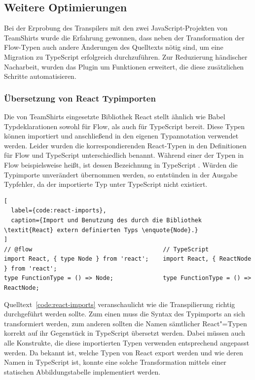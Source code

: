 

\subsection{Weitere Optimierungen}
\label{sec:optimizations}

Bei der Erprobung des Transpilers mit den zwei JavaScript-Projekten von TeamShirts wurde die Erfahrung gewonnen, dass neben der Transformation der Flow-Typen auch andere Änderungen des Quelltexts nötig sind, um eine Migration zu TypeScript erfolgreich durchzuführen. Zur Reduzierung händischer Nacharbeit, wurden das Plugin um Funktionen erweitert, die diese zusätzlichen Schritte automatisieren.

\subsubsection{Übersetzung von React Typimporten}
\label{sec:react-type-import-mapping}

Die von TeamShirts eingesetzte Bibliothek React stellt ähnlich wie Babel Typdeklarationen sowohl für Flow, als auch für TypeScript bereit. Diese Typen können importiert und anschließend in den eigenen Typannotation verwendet werden. Leider wurden die korrespondierenden React-Typen in den Definitionen für Flow und TypeScript unterschiedlich benannt. Während einer der Typen in Flow beispielsweise  heißt, ist dessen Bezeichnung in TypeScript . Würden die Typimporte unverändert übernommen werden, so entstünden in der Ausgabe Typfehler, da der importierte Typ unter TypeScript nicht existiert.

\begin{lstlisting}[
  label={code:react-imports},
  caption={Import und Benutzung des durch die Bibliothek \textit{React} extern definierten Typs \enquote{Node}.}
]
// @flow                                     // TypeScript
import React, { type Node } from 'react';    import React, { ReactNode } from 'react';
type FunctionType = () => Node;              type FunctionType = () => ReactNode;
\end{lstlisting}

Quelltext~\ref{code:react-imports} veranschaulicht wie die Transpilierung richtig durchgeführt werden sollte. Zum einen muss die Syntax des Typimports an sich transformiert werden, zum anderen sollten die Namen sämtlicher React"=Typen korrekt auf ihr Gegenstück in TypeScript übersetzt werden. Dabei müssen auch alle Konstrukte, die diese importierten Typen verwenden entsprechend angepasst werden. Da bekannt ist, welche Typen von React export werden und wie deren Namen in TypeScript ist, konnte eine solche Transformation mittels einer statischen Abbildungstabelle implementiert werden.

